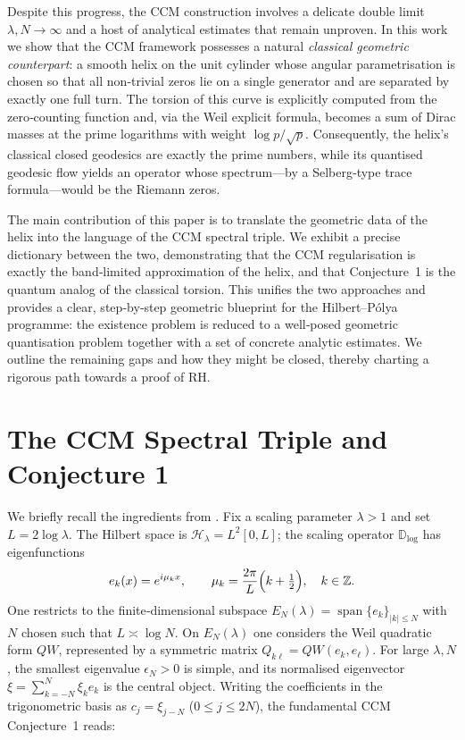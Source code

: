 \documentclass[12pt,a4paper]{article}
\newcommand{\Z}{\mathbb{Z}}
\begin{document}
Despite this progress, the CCM construction involves a delicate double limit \(\lambda,N\to\infty\) and a host of analytical estimates that remain unproven. In this work we show that the CCM framework possesses a natural \emph{classical geometric counterpart}: a smooth helix on the unit cylinder whose angular parametrisation is chosen so that all non‑trivial zeros lie on a single generator and are separated by exactly one full turn. The torsion of this curve is explicitly computed from the zero‑counting function and, via the Weil explicit formula, becomes a sum of Dirac masses at the prime logarithms with weight \(\log p/\sqrt{p}\). Consequently, the helix’s classical closed geodesics are exactly the prime numbers, while its quantised geodesic flow yields an operator whose spectrum—by a Selberg‑type trace formula—would be the Riemann zeros.

The main contribution of this paper is to translate the geometric data of the helix into the language of the CCM spectral triple. We exhibit a precise dictionary between the two, demonstrating that the CCM regularisation is exactly the band‑limited approximation of the helix, and that Conjecture~1 is the quantum analog of the classical torsion. This unifies the two approaches and provides a clear, step‑by‑step geometric blueprint for the Hilbert–P\'olya programme: the existence problem is reduced to a well‑posed geometric quantisation problem together with a set of concrete analytic estimates. We outline the remaining gaps and how they might be closed, thereby charting a rigorous path towards a proof of RH.

\section{The CCM Spectral Triple and Conjecture 1}
We briefly recall the ingredients from \cite{CCM2025}. Fix a scaling parameter \(\lambda>1\) and set \(L=2\log\lambda\). The Hilbert space is \(\mathcal{H}_\lambda=L^2[0,L]\); the scaling operator \(\mathbb{D}_{\log}\) has eigenfunctions
\[
e_k(x)=e^{i\mu_k x},\qquad \mu_k=\frac{2\pi}{L}\Bigl(k+\tfrac12\Bigr),\quad k\in\Z.
\]
One restricts to the finite‑dimensional subspace \(E_N(\lambda)=\operatorname{span}\{e_k\}_{|k|\le N}\) with \(N\) chosen such that \(L\asymp\log N\). On \(E_N(\lambda)\) one considers the Weil quadratic form \(QW\), represented by a symmetric matrix \(Q_{k\ell}=QW(e_k,e_\ell)\). For large \(\lambda,N\), the smallest eigenvalue \(\epsilon_N>0\) is simple, and its normalised eigenvector \(\xi=\sum_{k=-N}^N\xi_k e_k\) is the central object. Writing the coefficients in the trigonometric basis as \(c_j=\xi_{j-N}\) (\(0\le j\le 2N\)), the fundamental CCM Conjecture~1 reads:
\end{document}
